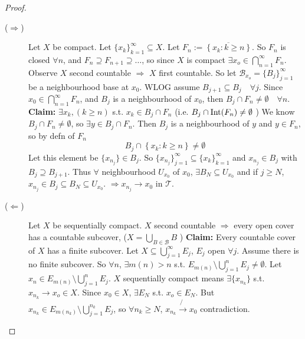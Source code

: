 \begin{proof} \leavevmode
    \begin{description}
        \item[($\Rightarrow$)] Let $X$ be compact. Let $\{x_{k}\}_{k=1}^{\infty} \subseteq X$.
        Let $F_n := \overline{\left\{ x_k : k \geq n \right\} }$. So $F_n$ is closed $\forall n$,
        and $F_n \supseteq F_{n + 1} \supseteq \dots$, so since $X$ is compact $\exists
        x_o \in \bigcap_{n=1}^\infty F_n$. Observe $X$ second countable $\Rightarrow$ $X$ first 
        countable. So let $\mathcal{B}_{x_o} = \{B_j\}_{j=1}^{\infty} $ be a neighbourhood base at $x_0$.
        WLOG assume $B_{j + 1} \subseteq B_j \quad \forall j$. Since $x_0 \in \bigcap_{n=1}^{\infty} F_n$,
        and $B_j$ is a neighbourhood of $x_0$, then $B_j \cap F_n \neq \emptyset \quad \forall n$.
        \newline \noindent\textbf{Claim:} $\exists x_k, (k \geq n)$ s.t. $x_k \in B_j \cap F_n$ 
        (i.e. $B_j \cap \operatorname{Int}(F_n) \neq \emptyset$ )
        \newline \noindent We know $B_j \cap F_n \neq \emptyset$, so $\exists y \in B_j \cap F_n$. Then
        $B_j$ is a neighbourhood of $y$ and $y \in F_n$, so by defn of $F_n$ 
        \[
            B_j \cap \left\{ x_k : k \geq n \right\} \neq \emptyset 
        \]     
        Let this element be $\{ x_{n_j} \} \in B_j$. So $ 
        \{x_{n_j}\}_{j=1}^{\infty} \subseteq \{x_{k}\}_{k=1}^{\infty}  $ and $x_{n_j} \in B_j$ with
        $B_j \supseteq B_{j + 1}$. Thus $\forall $ neighbourhood $U_{x_0}$ of $x_0$, $\exists B_N 
        \subseteq U_{x_0}$ and if $j \geq N$, $x_{n_j} \in B_j \subseteq B_N \subseteq U_{x_0}$.
        $\Rightarrow x_{n_j} \to x_0$ in $\mathcal{T}$.        

        \item[($\Leftarrow$)] Let $X$ be sequentially compact. $X$ second countable $\Rightarrow$ every
        open cover has a countable subcover, ($X = \bigcup_{B \in \mathcal{B}} B$ )
        \newline \noindent \textbf{Claim:} Every countable cover of $X$ has a finite subcover. 
        \newline \noindent Let $X \subseteq \bigcup_{j=1}^{\infty} E_j$, $E_j$ open $\forall j$. 
        Assume there is no finite 
        subcover. So $\forall n$, $\exists m(n) > n$ s.t. $E_{m(n)} \setminus \bigcup_{j=1}^{n} E_j 
        \neq \emptyset$. Let $x_n \in E_{m(n)} \setminus \bigcup_{j=1}^{n} E_j$. 
        $X$ sequentially compact means $\exists \{ x_{n_k} \} $ s.t. $x_{n_k} \to x_o \in X$.
        Since $x_0 \in X$, $\exists E_N$ s.t. $x_o \in E_N$. But $x_{n_k} \in E_{m(n_k)} \setminus 
        \bigcup_{j=1}^{n_k} E_j$, so $\forall n_k \geq N$, $x_{n_k} \not{\to} x_0$ contradiction.                
    \end{description}
\end{proof}

